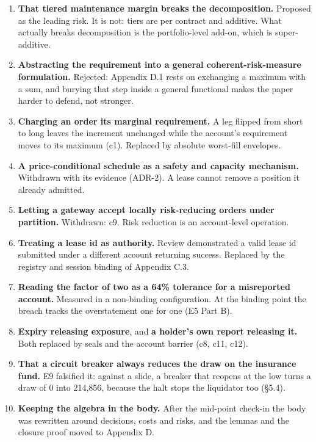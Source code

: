 \documentclass[10pt,a4paper]{article}
\providecommand{\tightlist}{\setlength{\itemsep}{0pt}\setlength{\parskip}{0pt}}
\begin{document}
\begin{enumerate}
\def\labelenumi{\arabic{enumi}.}
\tightlist
\item
  \textbf{That tiered maintenance margin breaks the decomposition.} Proposed as the
  leading risk. It is not: tiers are per contract and additive. What actually
  breaks decomposition is the portfolio-level add-on, which is super-additive.
\item
  \textbf{Abstracting the requirement into a general coherent-risk-measure
  formulation.} Rejected: Appendix D.1 rests on exchanging a maximum with a sum, and
  burying that step inside a general functional makes the paper harder to
  defend, not stronger.
\item
  \textbf{Charging an order its marginal requirement.} A leg flipped from short to
  long leaves the increment unchanged while the account's requirement moves to
  its maximum (c1). Replaced by absolute worst-fill envelopes.
\item
  \textbf{A price-conditional schedule as a safety and capacity mechanism.} Withdrawn
  with its evidence (ADR-2). A lease cannot remove a position it already
  admitted.
\item
  \textbf{Letting a gateway accept locally risk-reducing orders under partition.}
  Withdrawn: c9. Risk reduction is an account-level operation.
\item
  \textbf{Treating a lease id as authority.} Review demonstrated a valid lease id
  submitted under a different account returning success. Replaced by the
  registry and session binding of Appendix C.3.
\item
  \textbf{Reading the factor of two as a 64\% tolerance for a misreported account.}
  Measured in a non-binding configuration. At the binding point the breach
  tracks the overstatement one for one (E5 Part B).
\item
  \textbf{Expiry releasing exposure}, and \textbf{a holder's own report releasing it.}
  Both replaced by seals and the account barrier (c8, c11, c12).
\item
  \textbf{That a circuit breaker always reduces the draw on the insurance fund.} E9
  falsified it: against a slide, a breaker that reopens at the low turns a draw
  of 0 into 214,856, because the halt stops the liquidator too (§5.4).
\item
  \textbf{Keeping the algebra in the body.} After the mid-point check-in the body was
  rewritten around decisions, costs and risks, and the lemmas and the closure
  proof moved to Appendix D.
\end{enumerate}
\end{document}
